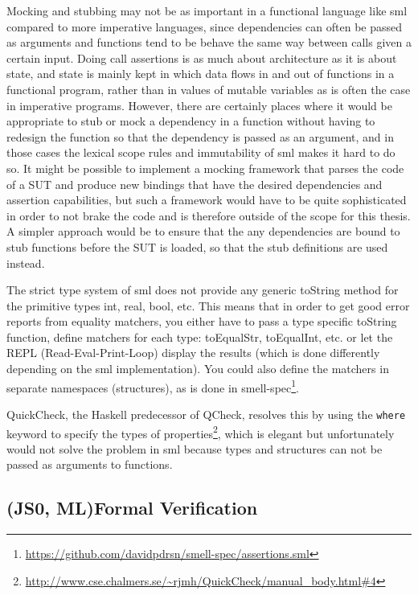 \documentclass[11pt]{article}
\begin{document}
Mocking and stubbing may not be as important in a functional language like \gls{sml} compared to more imperative languages, since dependencies can often be passed as arguments and functions tend to be behave the same way between calls given a certain input. Doing call assertions is as much about architecture as it is about state, and state is mainly kept in which data flows in and out of functions in a functional program, rather than in values of mutable variables as is often the case in imperative programs. However, there are certainly places where it would be appropriate to stub or mock a dependency in a function without having to redesign the function so that the dependency is passed as an argument, and in those cases the lexical scope rules and immutability of \gls{sml} makes it hard to do so. It might be possible to implement a mocking framework that parses the code of a SUT and produce new bindings that have the desired dependencies and assertion capabilities, but such a framework would have to be quite sophisticated in order to not brake the code and is therefore outside of the scope for this thesis. A simpler approach would be to ensure that the any dependencies are bound to stub functions before the SUT is loaded, so that the stub definitions are used instead. %

The strict type system of \gls{sml} does not provide any generic toString method for the primitive types int, real, bool, etc. This means that in order to get good error reports from equality \glspl{matcher}, you either have to pass a type specific toString function, define \glspl{matcher} for each type: toEqualStr, toEqualInt, etc. or let the REPL (Read-Eval-Print-Loop) display the results (which is done differently depending on the \gls{sml} implementation). You could also define the \glspl{matcher} in separate namespaces (structures), as is done in smell-spec\footnote{\url{https://github.com/davidpdrsn/smell-spec/assertions.sml}}.

QuickCheck, the Haskell predecessor of QCheck, resolves this by using the \texttt{where} keyword to specify the types of properties\footnote{\url{http://www.cse.chalmers.se/~rjmh/QuickCheck/manual\_body.html\#4}}, which is elegant but unfortunately would not solve the problem in \gls{sml} because types and structures can not be passed as arguments to functions. %

\subsection{(JS0, ML)Formal Verification}
\label{subsec:formalverification}
\end{document}
